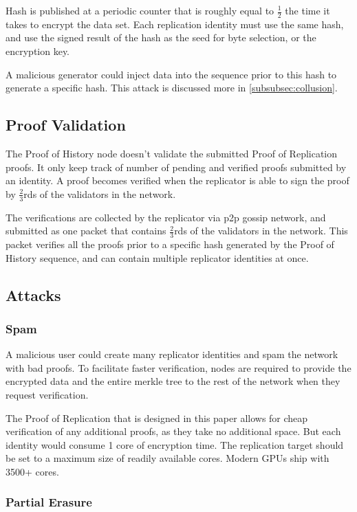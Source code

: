 \documentclass[12pt]{article}
\begin{document}
Hash is published at a periodic counter that is roughly equal to \(\frac{1}{2}\) the time it takes to encrypt the data set. Each replication identity must use the same hash, and use the signed result of the hash as the seed for byte selection, or the encryption key.

A malicious generator could inject data into the sequence prior to this hash to generate a specific hash. This attack is discussed more in \ref{subsubsec:collusion}.

\subsection{Proof Validation}
The Proof of History node doesn’t validate the submitted Proof of Replication proofs. It only keep track of number of pending and verified proofs submitted by an identity. A proof becomes verified when the replicator is able to sign the proof by \(\frac{2}{3}\)rds of the validators in the network. 

The verifications are collected by the replicator via p2p gossip network, and submitted as one packet that contains \(\frac{2}{3}\)rds of the validators in the network. This packet verifies all the proofs prior to a specific hash generated by the Proof of History sequence, and can contain multiple replicator identities at once.
\subsection{Attacks}
\subsubsection{Spam}
A malicious user could create many replicator identities and spam the network with bad proofs. To facilitate faster verification, nodes are required to provide the encrypted data and the entire merkle tree to the rest of the network when they request verification.

The Proof of Replication that is designed in this paper allows for cheap verification of any additional proofs, as they take no additional space. But each identity would consume 1 core of encryption time. The replication target should be set to a maximum size of readily available cores. Modern GPUs ship with 3500+ cores.

\subsubsection{Partial Erasure}
\end{document}
